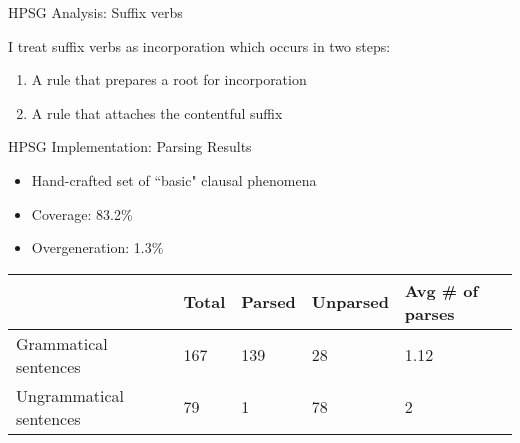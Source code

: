 \begin{frame}{HPSG Analysis: Suffix verbs}

I treat suffix verbs as incorporation which occurs in two steps:

\begin{enumerate}
\item A rule that prepares a root for incorporation
\item A rule that attaches the contentful suffix	
\end{enumerate}

\centering
{}

\end{frame}

\begin{frame}{HPSG Implementation: Parsing Results}

\begin{itemize}
\item Hand-crafted set of ``basic" clausal phenomena
\item Coverage: 83.2\%
\item Overgeneration: 1.3\%
\end{itemize}

\begin{table}[]
\centering
\label{tab:clause-coverage}
\begin{tabular}{l|llll}
 & Total & Parsed & Unparsed & Avg \# of parses \\ \hline
Grammatical sentences & 167 & 139 & 28 & 1.12 \\ \hline
Ungrammatical sentences & 79 & 1 & 78 & 2
\end{tabular}
\end{table}
	
\end{frame}
